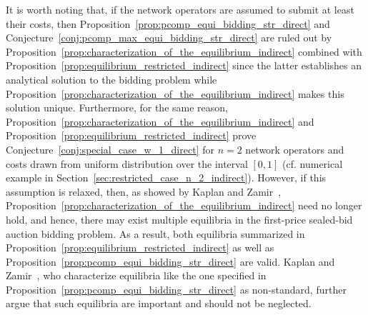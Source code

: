 It is worth noting that, if the network operators are assumed to submit at least their costs, then Proposition~\ref{prop:pcomp_equi_bidding_str_direct} and Conjecture~\ref{conj:pcomp_max_equi_bidding_str_direct} are ruled out by Proposition~\ref{prop:characterization_of_the_equilibrium_indirect} combined with Proposition~\ref{prop:equilibrium_restricted_indirect} since the latter establishes an analytical solution to the bidding problem while Proposition~\ref{prop:characterization_of_the_equilibrium_indirect} makes this solution unique. Furthermore, for the same reason, Proposition~\ref{prop:characterization_of_the_equilibrium_indirect} and Proposition~\ref{prop:equilibrium_restricted_indirect} prove Conjecture~\ref{conj:special_case_w_1_direct} for $n=2$ network operators and costs drawn from uniform distribution over the interval $[0,1]$ (cf. numerical example in Section~\ref{sec:restricted_case_n_2_indirect}). However, if this assumption is relaxed, then, as showed by Kaplan and Zamir~\cite{KaplanZamir2011}, Proposition~\ref{prop:characterization_of_the_equilibrium_indirect} need no longer hold, and hence, there may exist multiple equilibria in the first-price sealed-bid auction bidding problem. As a result, both equilibria summarized in Proposition~\ref{prop:equilibrium_restricted_indirect} as well as Proposition~\ref{prop:pcomp_equi_bidding_str_direct} are valid. Kaplan and Zamir~\cite{KaplanZamir2011}, who characterize equilibria like the one specified in Proposition~\ref{prop:pcomp_equi_bidding_str_direct} as non-standard, further argue that such equilibria are important and should not be neglected.

